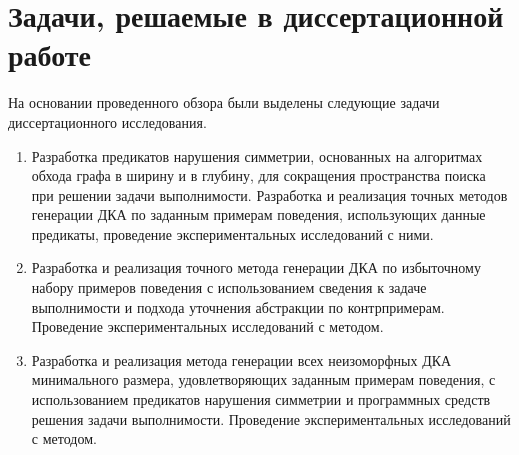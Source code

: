 

\section{Задачи, решаемые в диссертационной работе}
\label{sec:review:tasks}


На основании проведенного обзора были выделены следующие задачи диссертационного исследования.
\begin{enumerate}
  \item Разработка предикатов нарушения симметрии, основанных на алгоритмах обхода графа в ширину и в глубину, для сокращения пространства поиска при решении задачи выполнимости.
  Разработка и реализация точных методов генерации ДКА по заданным примерам поведения, использующих данные предикаты, проведение экспериментальных исследований с ними.

  \item Разработка и реализация точного метода генерации ДКА по избыточному набору примеров поведения с использованием сведения к задаче выполнимости и подхода уточнения абстракции по контрпримерам.
  Проведение экспериментальных исследований с методом.
  
  \item Разработка и реализация метода генерации всех неизоморфных ДКА минимального размера, удовлетворяющих заданным примерам поведения, с использованием предикатов нарушения симметрии и программных средств решения задачи выполнимости.
  Проведение экспериментальных исследований с методом.
\end{enumerate}


\chresults{\ref{sec:review}}